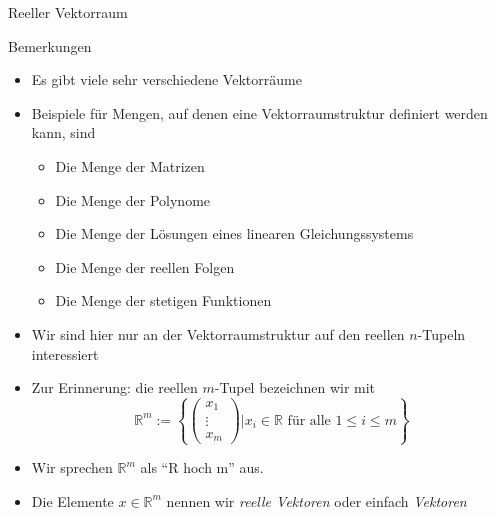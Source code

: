 \documentclass[
  8pt,
  ignorenonframetext,
]{beamer}
\providecommand{\tightlist}{%
  \setlength{\itemsep}{0pt}\setlength{\parskip}{0pt}}
\begin{document}
\begin{frame}{Reeller Vektorraum}
\protect\hypertarget{reeller-vektorraum-1}{}

\footnotesize

Bemerkungen

\begin{itemize}
\tightlist
\item
  Es gibt viele sehr verschiedene Vektorräume
\item
  Beispiele für Mengen, auf denen eine Vektorraumstruktur definiert
  werden kann, sind

  \begin{itemize}
  \tightlist
  \item
    \footnotesize Die Menge der Matrizen
  \item
    Die Menge der Polynome
  \item
    Die Menge der Lösungen eines linearen Gleichungssystems
  \item
    Die Menge der reellen Folgen
  \item
    Die Menge der stetigen Funktionen
  \end{itemize}
\item
  Wir sind hier nur an der Vektorraumstruktur auf den reellen
  \(n\)-Tupeln interessiert
\item
  Zur Erinnerung: die reellen \(m\)-Tupel bezeichnen wir mit
  \begin{equation}
  \mathbb{R}^m := \left\lbrace \begin{pmatrix} x_1 \\ \vdots \\ x_m \end{pmatrix} | x_i \in \mathbb{R} \mbox{ für alle } 1 \le i \le m \right\rbrace
  \end{equation}
\item
  Wir sprechen \(\mathbb{R}^m\) als ``R hoch m'' aus.
\item
  Die Elemente \(x \in \mathbb{R}^m\) nennen wir \emph{reelle Vektoren}
  oder einfach \emph{Vektoren}
\end{itemize}
\end{frame}
\end{document}
